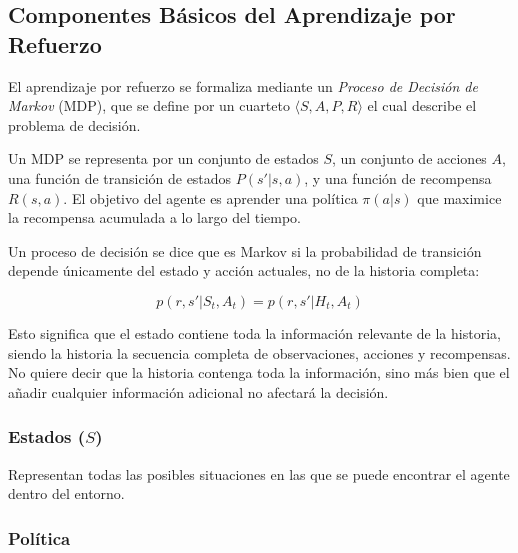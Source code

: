 \documentclass[a4paper,12pt]{report}
\begin{document}


\subsection{Componentes Básicos del Aprendizaje por Refuerzo}

El aprendizaje por refuerzo se formaliza mediante un \textit{Proceso de Decisión de Markov} (MDP), 
que se define por un cuarteto \(\langle S, A, P, R \rangle\) el cual describe el problema de decisión.

Un MDP se representa por un conjunto de estados \(S\), 
un conjunto de acciones \(A\), una función de transición de estados \(P(s'|s, a)\), y una función de 
recompensa \(R(s, a)\). El objetivo del agente es aprender una política \(\pi(a|s)\) que maximice la 
recompensa acumulada a lo largo del tiempo.

Un proceso de decisión se dice que es Markov si la probabilidad de transición depende únicamente
del estado y acción actuales, no de la historia completa:

\[
p(r, s' | S_t, A_t) = p(r, s' | H_t, A_t)
\]

Esto significa que el estado contiene toda la información relevante de la historia, siendo la historia 
la secuencia completa de observaciones, acciones y recompensas. No quiere decir que la historia contenga
toda la información, sino más bien que el añadir cualquier información adicional no afectará la decisión.

\subsubsection{Estados (\(S\))}
    Representan todas las posibles situaciones en las que se puede encontrar el agente dentro del entorno.
\subsubsection{Política}
\end{document}

